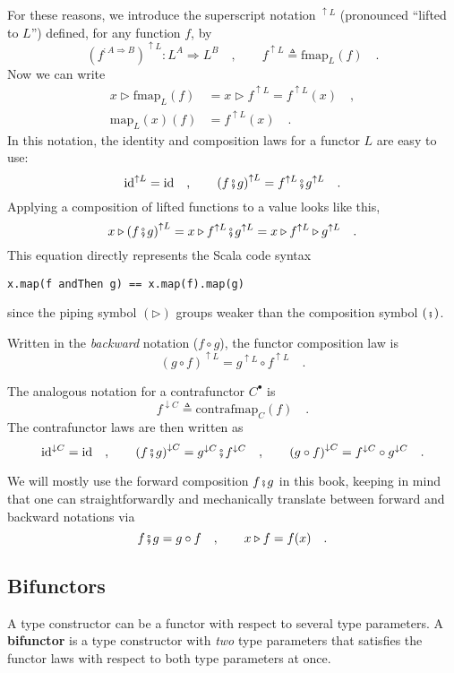 For these reasons, we introduce the superscript notation $^{\uparrow L}$
(pronounced ``lifted to $L$'') defined, for any function $f$,
by
\[
(f^{:A\Rightarrow B})^{\uparrow L}:L^{A}\Rightarrow L^{B}\quad,\quad\quad f^{\uparrow L}\triangleq\text{fmap}_{L}(f)\quad.
\]
Now we can write 
\begin{align*}
x\triangleright\text{fmap}_{L}(f) & =x\triangleright f^{\uparrow L}=f^{\uparrow L}(x)\quad,\\
\text{map}_{L}(x)(f) & =f^{\uparrow L}(x)\quad.
\end{align*}
In this notation, the identity and composition laws for a functor
$L$ are easy to use:
\[
\text{id}^{\uparrow L}=\text{id}\quad,\quad\quad\left(f\bef g\right)^{\uparrow L}=f^{\uparrow L}\bef g^{\uparrow L}\quad.
\]
Applying a composition of lifted functions to a value looks like this,
\[
x\triangleright\left(f\bef g\right)^{\uparrow L}=x\triangleright f^{\uparrow L}\bef g^{\uparrow L}=x\triangleright f^{\uparrow L}\triangleright g^{\uparrow L}\quad.
\]
This equation directly represents the Scala code syntax
\begin{lstlisting}
x.map(f andThen g) == x.map(f).map(g)
\end{lstlisting}
since the piping symbol $\left(\triangleright\right)$ groups weaker
than the composition symbol $\left(\bef\right)$.

Written in the \emph{backward} notation ($f\circ g$), the functor
composition law is
\[
\left(g\circ f\right)^{\uparrow L}=g^{\uparrow L}\circ f^{\uparrow L}\quad.
\]

The analogous notation for a contrafunctor $C^{\bullet}$ is
\[
f^{\downarrow C}\triangleq\text{contrafmap}_{C}(f)\quad.
\]
The contrafunctor laws are then written as
\[
\text{id}^{\downarrow C}=\text{id}\quad,\quad\quad\left(f\bef g\right)^{\downarrow C}=g^{\downarrow C}\bef f^{\downarrow C}\quad,\quad\quad\left(g\circ f\right)^{\downarrow C}=f^{\downarrow C}\circ g^{\downarrow C}\quad.
\]

We will mostly use the forward composition $f\bef g$ in this book,
keeping in mind that one can straightforwardly and mechanically translate
between forward and backward notations via 
\[
f\bef g=g\circ f\quad,\quad\quad x\triangleright f=f(x)\quad.
\]


\subsection{Bifunctors\label{subsec:Bifunctors}}

A type constructor can be a functor with respect to several type parameters.
A \textbf{bifunctor} is a type constructor with
\emph{two} type parameters that satisfies the functor laws with respect
to both type parameters at once.

